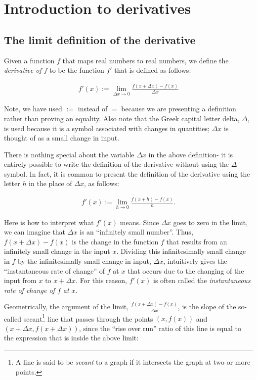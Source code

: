 \newpage

\section*{Introduction to derivatives}

\subsection*{The limit definition of the derivative}

Given a function $f$ that maps real numbers to real numbers, we define the \textit{derivative of $f$} to be the function $f'$ that is defined as follows:
     
\begin{align*}
     \boxed
     {
        f'(x) := \lim_{\Delta x \rightarrow 0} \frac{f(x + \Delta x) - f(x)}{\Delta x}
     }
\end{align*}

Note, we have used $:=$ instead of $=$ because we are presenting a definition rather than proving an equality. Also note that the Greek capital letter delta, $\Delta$, is used because it is a symbol associated with changes in quantities; $\Delta x$ is thought of as a small change in input. 

There is nothing special about the variable $\Delta x$ in the above definition- it is entirely possible to write the definition of the derivative without using the $\Delta$ symbol. In fact, it is common to present the definition of the derivative using the letter $h$ in the place of $\Delta x$, as follows:

\begin{align*}
    f'(x) := \lim_{h \rightarrow 0} \frac{f(x + h) - f(x)}{h}.
\end{align*}

Here is how to interpret what $f'(x)$ means. Since $\Delta x$ goes to zero in the limit, we can imagine that $\Delta x$ is an ``infinitely small number''. Thus, $f(x + \Delta x) - f(x)$ is the change in the function $f$ that results from an infinitely small change in the input $x$. Dividing this infinitesimally small change in $f$ by the infinitesimally small change in input, $\Delta x$, intuitively gives the ``instantaneous rate of change'' of $f$ at $x$ that occurs due to the changing of the input from $x$ to $x + \Delta x$. For this reason, $f'(x)$ is often called the \textit{instantaneous rate of change of $f$ at $x$}.

Geometrically, the argument of the limit, $\frac{f(x + \Delta x) - f(x)}{\Delta x}$, is the slope of the so-called secant\footnote{A line is said to be \textit{secant} to a graph if it intersects the graph at two or more points.} line that passes through the points $(x, f(x))$ and $(x + \Delta x, f(x + \Delta x))$, since the ``rise over run'' ratio of this line is equal to the expression that is inside the above limit:

